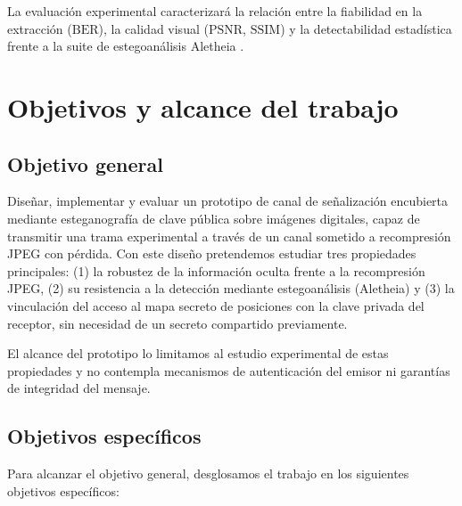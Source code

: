 \documentclass[IB]{TFUOC}%
\begin{document}
La evaluación experimental caracterizará la relación entre la fiabilidad en la extracción ($\mathrm{BER}$), la calidad visual ($\mathrm{PSNR}$, $\mathrm{SSIM}$) y la detectabilidad estadística frente a la suite de estegoanálisis Aletheia \cite{1}.

\section{Objetivos y alcance del trabajo}
\label{sec:objetivos_alcance}

\subsection{Objetivo general}
Diseñar, implementar y evaluar un prototipo de canal de señalización encubierta mediante esteganografía de clave pública sobre imágenes digitales, capaz de transmitir una trama experimental a través de un canal sometido a recompresión JPEG con pérdida. Con este diseño pretendemos estudiar tres propiedades principales: (1) la robustez de la información oculta frente a la recompresión JPEG, (2) su resistencia a la detección mediante estegoanálisis (Aletheia) y (3) la vinculación del acceso al mapa secreto de posiciones con la clave privada del receptor, sin necesidad de un secreto compartido previamente.

El alcance del prototipo lo limitamos al estudio experimental de estas propiedades y no contempla mecanismos de autenticación del emisor ni garantías de integridad del mensaje.

\subsection{Objetivos específicos}
Para alcanzar el objetivo general, desglosamos el trabajo en los siguientes objetivos específicos:
\end{document}
